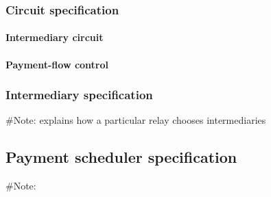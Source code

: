 \documentclass{article}
\begin{document}
 \subsubsection{Circuit specification}
 
 	\paragraph*{Intermediary circuit}
 	
 	\paragraph*{Payment-flow control}
 	
 \subsubsection{Intermediary specification}
 	\#Note: explains how a particular relay chooses intermediaries
\subsection{Payment scheduler specification}
	\#Note: 
\end{document}
